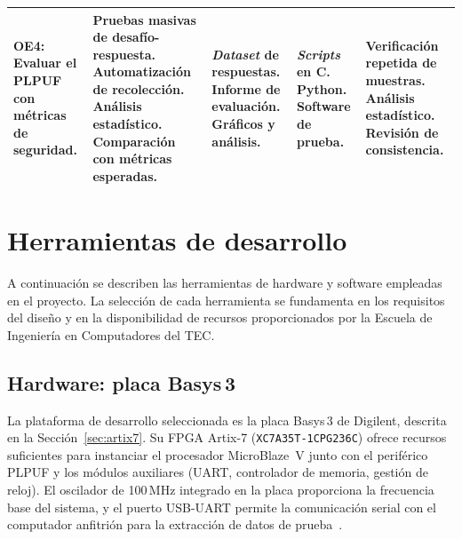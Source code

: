 \begin{table}[htbp]
\begin{tabular}{|p{3.0cm}|p{3.0cm}|p{2.5cm}|p{2.5cm}|p{2.5cm}|}
OE4: Evaluar el PLPUF con métricas de seguridad. &
Pruebas masivas de desafío-respuesta.\newline
Automatización de recolección.\newline
Análisis estadístico.\newline
Comparación con métricas esperadas. &
\textit{Dataset} de respuestas.\newline
Informe de evaluación.\newline
Gráficos y análisis. &
\textit{Scripts} en C.\newline
Python.\newline
Software de prueba. &
Verificación repetida de muestras.\newline
Análisis estadístico.\newline
Revisión de consistencia. \\
\hline
\end{tabular}
\end{table}

\section{Herramientas de desarrollo}
\label{sec:herramientas}

A continuación se describen las herramientas de hardware y software empleadas
en el proyecto. La selección de cada herramienta se fundamenta en los
requisitos del diseño y en la disponibilidad de recursos proporcionados por
la Escuela de Ingeniería en Computadores del TEC.

\subsection{Hardware: placa Basys\,3}
\label{sec:hw_basys3}

La plataforma de desarrollo seleccionada es la placa Basys\,3 de Digilent,
descrita en la Sección~\ref{sec:artix7}. Su FPGA Artix-7
(\texttt{XC7A35T-1CPG236C}) ofrece recursos suficientes para instanciar el
procesador MicroBlaze~V junto con el periférico PLPUF y los módulos
auxiliares (UART, controlador de memoria, gestión de reloj). El oscilador de
100\,MHz integrado en la placa proporciona la frecuencia base del sistema, y
el puerto USB-UART permite la comunicación serial con el computador anfitrión
para la extracción de datos de prueba~\cite{basys3rm}.

